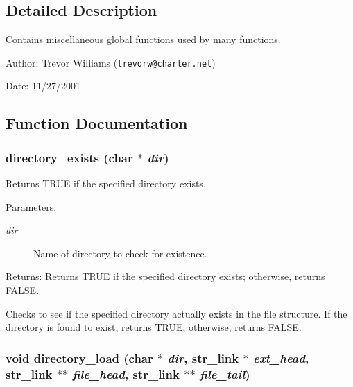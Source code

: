 \subsection{Detailed Description}
Contains miscellaneous global functions used by many functions. 

\begin{Desc}
\item[Author:]Trevor Williams ({\tt trevorw@charter.net}) \end{Desc}
\begin{Desc}
\item[Date:]11/27/2001 \end{Desc}


\subsection{Function Documentation}
\subsubsection{ directory\_\-exists (char $\ast$ {\em dir})}\label{util_8h_a5}


Returns TRUE if the specified directory exists. 

\begin{Desc}
\item[Parameters:]
\begin{description}
\item[{\em dir}]Name of directory to check for existence. \end{description}
\end{Desc}
\begin{Desc}
\item[Returns:]Returns TRUE if the specified directory exists; otherwise, returns FALSE.\end{Desc}
Checks to see if the specified directory actually exists in the file structure. If the directory is found to exist, returns TRUE; otherwise, returns FALSE. 
\subsubsection{\setlength{\rightskip}{0pt plus 5cm}void directory\_\-load (char $\ast$ {\em dir}, {\bf str\_\-link} $\ast$ {\em ext\_\-head}, {\bf str\_\-link} $\ast$$\ast$ {\em file\_\-head}, {\bf str\_\-link} $\ast$$\ast$ {\em file\_\-tail})}\label{util_8h_a6}


